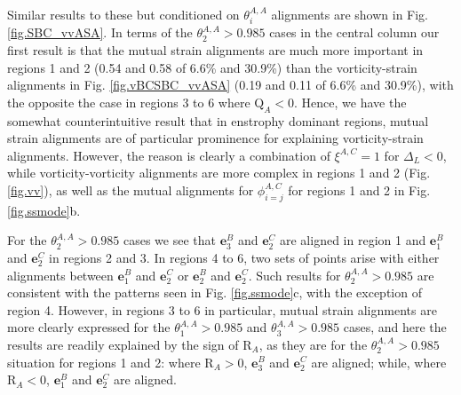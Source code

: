 \documentclass[preprint,amssymb,amsmath,aip,cha]{revtex4-1}
\begin{document}
Similar results to these but conditioned on $\theta^{A,A}_{i}$ alignments are shown in Fig. \ref{fig.SBC_vvASA}. In terms of the $\theta^{A,A}_{2} > 0.985$ cases in the central column our first result is that the mutual strain alignments are much more important in regions 1 and 2 (0.54 and 0.58 of 6.6\% and 30.9\%) than the vorticity-strain alignments in Fig. \ref{fig.vBCSBC_vvASA} (0.19 and 0.11 of 6.6\% and 30.9\%), with the opposite the case in regions 3 to 6 where $\mbox{Q}_{A} < 0$. Hence, we have the somewhat counterintuitive result that in enstrophy dominant regions, mutual strain alignments are of particular prominence for explaining vorticity-strain alignments. However, the reason is clearly a combination of $\xi^{A,C} = 1$ for $\Delta_{L} < 0$, while vorticity-vorticity alignments are more complex in regions 1 and 2 (Fig. \ref{fig.vv}), as well as the mutual alignments for $\phi^{A,C}_{i = j}$ for regions 1 and 2 in Fig. \ref{fig.ssmode}b. 

For the $\theta^{A,A}_{2} > 0.985$ cases we see that $\mathbf{e}^{B}_{3}$ and $\mathbf{e}^{C}_{2}$ are aligned in region 1 and $\mathbf{e}^{B}_{1}$ and $\mathbf{e}^{C}_{2}$ in regions 2 and 3. In regions 4 to 6, two sets of points arise with either alignments between $\mathbf{e}^{B}_{1}$ and $\mathbf{e}^{C}_{2}$ or $\mathbf{e}^{B}_{2}$ and $\mathbf{e}^{C}_{2}$. Such results for $\theta^{A,A}_{2} > 0.985$ are consistent with the patterns seen in Fig. \ref{fig.ssmode}c, with the exception of region 4. However, in regions 3 to 6 in particular, mutual strain alignments are more clearly expressed for the $\theta^{A,A}_{1} > 0.985$ and $\theta^{A,A}_{3} > 0.985$ cases, and here the results are readily explained by the sign of $\mbox{R}_{A}$, as they are for the $\theta^{A,A}_{2} > 0.985$ situation for regions 1 and 2: where $\mbox{R}_{A} > 0$, $\mathbf{e}^{B}_{3}$ and $\mathbf{e}^{C}_{2}$ are aligned; while, where $\mbox{R}_{A} < 0$, $\mathbf{e}^{B}_{1}$ and $\mathbf{e}^{C}_{2}$ are aligned.
\end{document}
